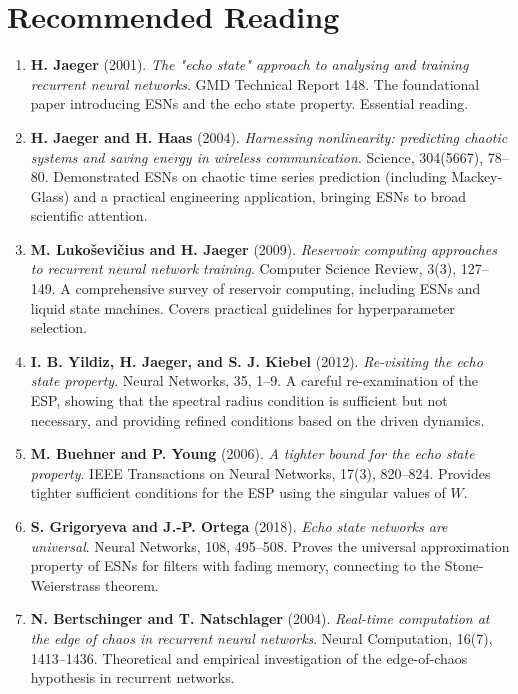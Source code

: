 \section*{Recommended Reading}

\begin{enumerate}[nosep]
  \item \textbf{H. Jaeger} (2001). \textit{The "echo state" approach to analysing and training recurrent neural networks}. GMD Technical Report 148. The foundational paper introducing ESNs and the echo state property. Essential reading.

  \item \textbf{H. Jaeger and H. Haas} (2004). \textit{Harnessing nonlinearity: predicting chaotic systems and saving energy in wireless communication}. Science, 304(5667), 78--80. Demonstrated ESNs on chaotic time series prediction (including Mackey-Glass) and a practical engineering application, bringing ESNs to broad scientific attention.

  \item \textbf{M. Lukoševičius and H. Jaeger} (2009). \textit{Reservoir computing approaches to recurrent neural network training}. Computer Science Review, 3(3), 127--149. A comprehensive survey of reservoir computing, including ESNs and liquid state machines. Covers practical guidelines for hyperparameter selection.

  \item \textbf{I. B. Yildiz, H. Jaeger, and S. J. Kiebel} (2012). \textit{Re-visiting the echo state property}. Neural Networks, 35, 1--9. A careful re-examination of the ESP, showing that the spectral radius condition is sufficient but not necessary, and providing refined conditions based on the driven dynamics.

  \item \textbf{M. Buehner and P. Young} (2006). \textit{A tighter bound for the echo state property}. IEEE Transactions on Neural Networks, 17(3), 820--824. Provides tighter sufficient conditions for the ESP using the singular values of $W$.

  \item \textbf{S. Grigoryeva and J.-P. Ortega} (2018). \textit{Echo state networks are universal}. Neural Networks, 108, 495--508. Proves the universal approximation property of ESNs for filters with fading memory, connecting to the Stone-Weierstrass theorem.

  \item \textbf{N. Bertschinger and T. Natschlager} (2004). \textit{Real-time computation at the edge of chaos in recurrent neural networks}. Neural Computation, 16(7), 1413--1436. Theoretical and empirical investigation of the edge-of-chaos hypothesis in recurrent networks.
\end{enumerate}
